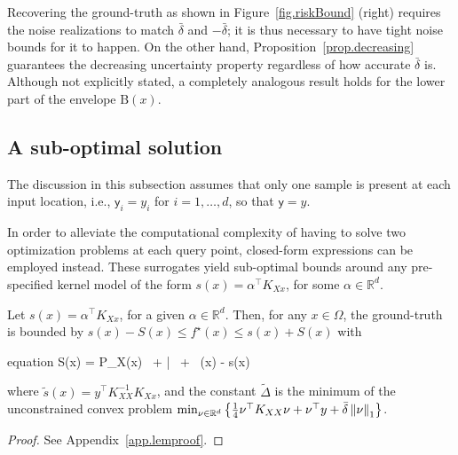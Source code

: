 \begin{remark}
	Recovering the ground-truth as shown in Figure~\ref{fig.riskBound} (right) requires the noise realizations to match $\bar \delta$ and $-\bar \delta$; it is thus necessary to have tight noise bounds for it to happen. On the other hand, Proposition~\ref{prop.decreasing} guarantees the decreasing uncertainty property regardless of how accurate $\bar \delta$ is. Although not explicitly stated, a completely analogous result holds for the lower part of the envelope $\text{B}(x)$.
\end{remark}

\subsection{A sub-optimal solution}

The discussion in this subsection assumes that only one sample is present at each input location, i.e., $\mathsf{y}_i = y_i$ for $i=1,\dots,d $, so that $\mathsf{y}=y$.

In order to alleviate the computational complexity of having to solve two optimization problems at each query point, closed-form expressions can be employed instead. These surrogates yield sub-optimal bounds around any pre-specified kernel model of the form $s(x) = \alpha^\top K_{Xx}$, for some $\alpha \in \mathbb{R}^d$. 
\begin{proposition}
	\label{prop:uniform}
	Let $s(x)=\alpha^\top K_{Xx}$, for a given $\alpha \in \mathbb{R}^d$. Then, for any $x\in \Omega$, the ground-truth is bounded by $s(x) - S(x) \leq f^\star(x) \leq s(x) + S(x)$ with
	\begin{empheq}[box={\mymathbox[colback=black!2,drop small lifted shadow, sharp corners]}]{equation}
		S(x) =  P_X(x) \,  + \bar{\delta} \,  + \, \vert {}(x) - s(x) \vert
		\label{eq.uniformBound2}
	\end{empheq}
	where $\tilde{s}(x) = y^\top K_{XX}^{-1} K_{Xx}$, and the constant $\tilde\Delta$ is the minimum of the unconstrained convex problem $\min_{\nu \in \mathbb{R}^d} \left\{ \frac{1}{4}\nu^\top K_{XX}\nu + \nu^\top y + \bar{\delta} \left\| \nu \right\|_1\right\}$.
\end{proposition}
\begin{proof}
	See Appendix~\ref{app.lemproof}.
\end{proof}


